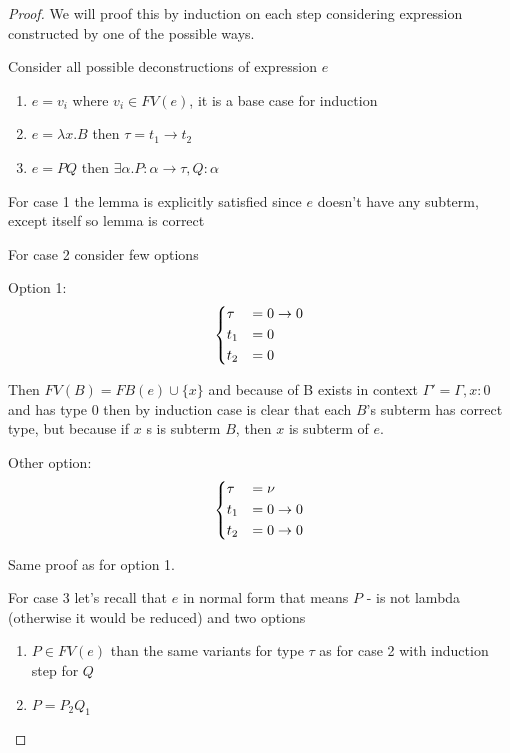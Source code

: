 \documentclass[11pt]{article}
\newcommand{\ga}{\alpha}
\newcommand{\gl}{\lambda}
\newcommand{\too}{\rightarrow}
\begin{document}
\begin{proof}
    
    We will proof this by induction on each step considering expression constructed by one of the possible ways.

    Consider all possible deconstructions of expression \(e\)

    \begin{enumerate}
        \item \(e = v_i\) where \(v_i \in FV(e)\), it is a base case for induction
        \item \(e = \gl x. B\) then \(\tau = t_1 \too t_2\)
        \item \(e = P Q\) then \(\exists \ga. P : \ga \too \tau, Q : \ga\)
    \end{enumerate}

    For case 1 the lemma is explicitly satisfied since \(e\) doesn't have any subterm, except itself so lemma is correct

    For case 2 consider few options
    
    Option 1:
    \begin{align*}
        \begin{dcases}
            \tau &= 0 \too 0 \\
            t_1 &= 0 \\
            t_2 &= 0
        \end{dcases}
    \end{align*}

    Then \(FV(B) = FB(e) \cup \{x\}\) and because of B exists in context \(\Gamma' = \Gamma, x:0\) and has type \(0\) then by induction case is clear that each \(B\)'s subterm has correct type, but because if \(x\) s is subterm \(B\), then \(x\) is subterm of \(e\).

    Other option:
    \begin{align*}
        \begin{dcases}
            \tau &= \nu \\
            t_1 &= 0 \too 0 \\
            t_2 &= 0 \too 0
        \end{dcases}
    \end{align*}

    Same proof as for option 1.

    For case 3 let's recall that \(e\) in normal form that means \(P\) - is not lambda (otherwise it would be reduced) and two options

    \begin{enumerate}
        \item \(P \in FV(e)\) than the same variants for type \(\tau\) as for case 2 with induction step for \(Q\)
        \item \(P = P_2 Q_1\)


\end{enumerate}
\end{proof}
\end{document}
